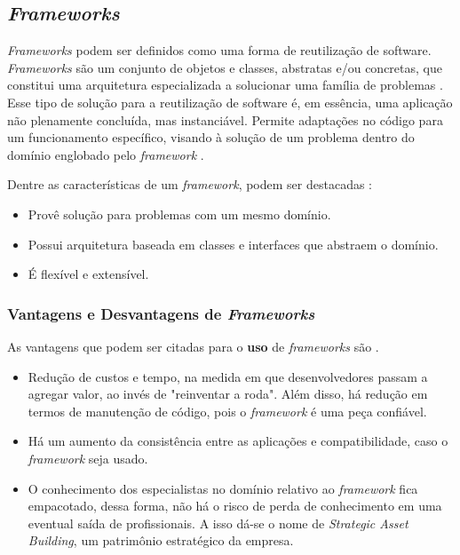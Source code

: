\subsection{\textit{Frameworks}}
\textit{Frameworks} podem ser definidos como uma forma de reutilização de software.
\textit{Frameworks} são um conjunto de objetos e classes, abstratas e/ou concretas,
que constitui uma arquitetura especializada a solucionar uma família de problemas
\cite{barretoJunior2006}. Esse tipo de solução para a reutilização de software é,
em essência, uma aplicação não plenamente concluída, mas instanciável. Permite
adaptações no código para um funcionamento específico, visando à solução de um
problema dentro do domínio englobado pelo \textit{framework} \cite{barretoJunior2006}.
\par
\indent Dentre as características de um \textit{framework}, podem ser destacadas
\cite{sauve2006}:
\begin{itemize}
\item Provê solução para problemas com um mesmo domínio.
\item Possui arquitetura baseada em classes e interfaces que abstraem o domínio.
\item É flexível e extensível.
\end{itemize}
\par
\subsubsection{Vantagens e Desvantagens de \textit{Frameworks}}
As vantagens que podem ser citadas para o \textbf{uso} de \textit{frameworks} são
\cite{barretoJunior2006} \cite{sauve2006}.
\begin{itemize}
\item Redução de custos e tempo, na medida em que desenvolvedores passam a
agregar valor, ao invés de "reinventar a roda". Além disso, há redução em termos
de manutenção de código, pois o \textit{framework} é uma peça confiável.
\item Há um aumento da consistência entre as aplicações e compatibilidade, caso o
\textit{framework} seja usado.
\item O conhecimento dos especialistas no domínio relativo ao \textit{framework}
fica empacotado, dessa forma, não há o risco de perda de conhecimento em uma eventual
saída de profissionais. A isso dá-se o nome de \textit{Strategic Asset Building},
um patrimônio estratégico da empresa.
\end{itemize}


